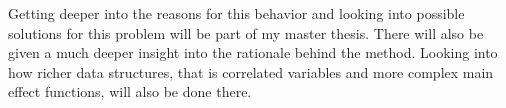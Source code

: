 \documentclass[11pt, a4paper, leqno]{article}
\begin{document}
Getting deeper into the reasons for this behavior and looking into possible solutions for this problem will be part of my master thesis. There will also be given a much deeper insight into the rationale behind the method. Looking into how richer data structures, that is correlated variables and more complex main effect functions, will also be done there. 

\pagebreak










\end{document}
